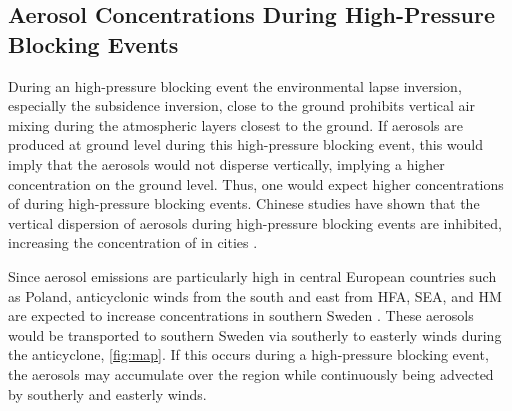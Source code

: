 \subsection{Aerosol Concentrations During High-Pressure Blocking Events}
During an high-pressure blocking event the environmental lapse inversion, especially the subsidence inversion, close to the ground prohibits vertical air mixing during the atmospheric layers closest to the ground. If aerosols are produced at ground level during this high-pressure blocking event, this would imply that the aerosols would not disperse vertically, implying a higher concentration on the ground level. Thus, one would expect higher concentrations of \PM during high-pressure blocking events. Chinese studies have shown that the vertical dispersion of aerosols during high-pressure blocking events are inhibited, increasing the concentration of \PM in cities \cite{caiImpactBlockingStructure2020}.

Since aerosol emissions are particularly high in central European countries such as Poland, anticyclonic winds from the south and east from HFA, SEA, and HM are expected to increase \PM concentrations in southern Sweden \cite{europeanenvironmentagencyEuropesAirQuality2024}. These aerosols would be transported to southern Sweden via southerly to easterly winds during the anticyclone,  \autoref{fig:map}. If this occurs during a high-pressure blocking event, the aerosols may accumulate over the region while continuously being advected by southerly and easterly winds. 


